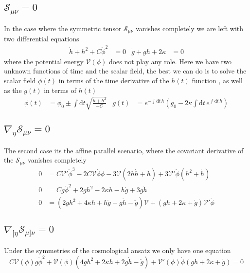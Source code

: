 \documentclass[10pt,a4paper]{article}
\begin{document}
\subsection{$\mathcal{S}_{\mu\nu} = 0 $}

In the case where the symmetric tensor $\mathcal{S}_{\mu\nu}$ vanishes completely we are left with two differential equations
\begin{align}
  \dot{h} + h^2 + C\dot{\phi}^2 & = 0 & \dot{g} + gh + 2\kappa & = 0
\end{align}
where the potential energy $\mathcal{V}(\phi)$ does not play any role. Here we have two unknown functions of time and the scalar field, the best we 
can do is to solve the scalar field $\phi(t)$ in terms of the time derivative of the $h(t)$ function , as well as the $g(t)$ in terms of $h(t)$
\begin{align}
  \phi(t) & = \phi_0 \pm \int \mathrm{d}t \sqrt{\frac{\dot{h} + h^2}{-C}} & 
  g(t) & = e^{- \int \mathrm{d}t \, h} \left( g_0 - 2 \kappa \int \mathrm{d}t \, e^{\int \mathrm{d}t \, h} \right)
\end{align}


\subsection{$\nabla_{\eta} \mathcal{S}_{\mu\nu} = 0 $}

The second case its the affine parallel scenario, where the covariant derivative of the $\mathcal{S}_{\mu\nu}$ vanishes completely
\begin{align}
  0 & = C\mathcal{V}'\dot{\phi}^3-2C\mathcal{V}\dot{\phi}\ddot{\phi} - 3\mathcal{V}\left(2h\dot{h} + \ddot{h}\right) + 3\mathcal{V}'\dot{\phi}
  \left(h^{2} + \dot{h}\right) \\
  0 & = Cg\dot{\phi}^2 + 2gh^2 - 2\kappa h - h\dot{g} + 3g\dot{h} \\
  0 & = \left(2gh^2 + 4\kappa h +h\dot{g} - g \dot{h} - \ddot{g}\right)\mathcal{V} + \left(gh + 2\kappa + \dot{g}\right)\mathcal{V}'\dot{\phi}
\end{align}

\subsection{$\nabla_{[\eta} \mathcal{S}_{\mu]\nu} = 0 $}

Under the symmetries of the cosmological ansatz we only have one equation 
\begin{equation}
  C\mathcal{V}(\phi)g\dot{\phi}^2 + \mathcal{V}(\phi)\left(4gh^2 +2\kappa h + 2g\dot{h} - \ddot{g}\right) +
  \mathcal{V}'(\phi)\dot{\phi}\left(gh + 2\kappa + \dot{g}\right) = 0
\end{equation}
\end{document}
